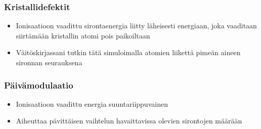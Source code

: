 \documentclass[beamer,11pt,aspectratio=169]{beamer}
\begin{document}
\begin{frame}
    \frametitle{Kristallidefektit}
    \begin{itemize}
        \item Ionisaatioon vaadittu sirontaenergia liitty läheisesti energiaan, joka vaaditaan siirtämään kristallin atomi pois paikoiltaan
        \item Väitöskirjassani tutkin tätä simuloimalla atomien liikettä pimeän aineen sironnan seurauksena
    \end{itemize}
\end{frame}

\begin{frame}
    \frametitle{Päivämodulaatio}
    \begin{itemize}
        \item Ionisaatioon vaadittu energia suuntariippuvainen
        \item Aiheuttaa pävittäisen vaihtelun havaittavissa olevien sirontojen määrään
    \end{itemize}
\end{frame}
\end{document}

